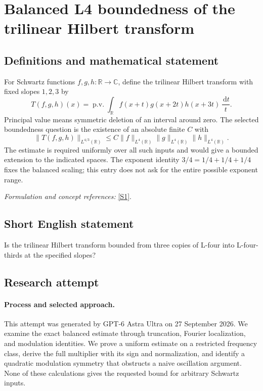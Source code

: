 \documentclass[11pt]{article}
\begin{document}
\section*{\texorpdfstring{Balanced L4 boundedness of the trilinear Hilbert transform}{Balanced L4 boundedness of the trilinear Hilbert transform}}\label{30006939}
\subsection{Definitions and mathematical statement}
For Schwartz functions $f,g,h:{\mathbb{R}}\to{\mathbb{C}}$, define the trilinear Hilbert transform with fixed slopes $1,2,3$ by
\[
 T(f,g,h)(x)=\operatorname{p.v.}\int_{{\mathbb{R}}}
 f(x+t)g(x+2t)h(x+3t)\,\frac{{\,\mathrm{d}} t}{t}.
\]
Principal value means symmetric deletion of an interval around zero. The selected boundedness question is the existence of an absolute finite $C$ with
\[
 \|T(f,g,h)\|_{L^{4/3}({\mathbb{R}})}
 \le C\|f\|_{L^4({\mathbb{R}})}\|g\|_{L^4({\mathbb{R}})}\|h\|_{L^4({\mathbb{R}})}.
\]
The estimate is required uniformly over all such inputs and would give a bounded extension to the indicated spaces. The exponent identity $3/4=1/4+1/4+1/4$ fixes the balanced scaling; this entry does not ask for the entire possible exponent range.
\par\smallskip\textit{Formulation and concept references:} \href{https://terrytao.wordpress.com/2007/05/10/open-question-boundedness-of-the-trilinear-hilbert-transform/}{[S1]}.

\subsection{Short English statement}
Is the trilinear Hilbert transform bounded from three copies of L-four into L-four-thirds at the specified slopes?
\subsection{Research attempt}
\paragraph{Process and selected approach.}
This attempt was generated by GPT-6 Astra Ultra on 27 September 2026. We examine the exact balanced estimate through truncation, Fourier localization, and modulation identities. We prove a uniform estimate on a restricted frequency class, derive the full multiplier with its sign and normalization, and identify a quadratic modulation symmetry that obstructs a naive oscillation argument. None of these calculations gives the requested bound for arbitrary Schwartz inputs.
\end{document}
